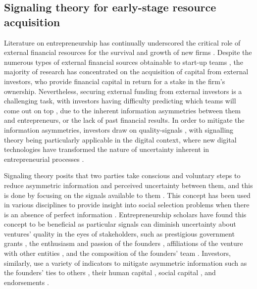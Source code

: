 \documentclass[12pt]{article}
\begin{document}
\subsection{Signaling theory for early-stage resource acquisition}

Literature on entrepreneurship has continually underscored the critical role of external financial resources for the survival and growth of new firms \citep{cooper1994initial}. Despite the numerous types of external financial sources obtainable to start-up teams \citep{drover2017review, klein2020start}, the majority of research has concentrated on the acquisition of capital from external investors, who provide financial capital in return for a stake in the firm's ownership. Nevertheless, securing external funding from external investors is a challenging task, with investors having difficulty predicting which teams will come out on top \citep{ghassemiautomated}, due to the inherent information asymmetries between them and entrepreneurs, or the lack of past financial results. In order to mitigate the information asymmetries, investors draw on quality-signals \citep{ko2018signaling, spence1978job, subramanian2022backing}, with signalling theory being particularly applicable in the digital context, where new digital technologies have transformed the nature of uncertainty inherent in entrepreneurial processes \citep{nambisan2017digital}.

Signaling theory posits that two parties take conscious and voluntary steps to reduce asymmetric information and perceived uncertainty between them, and this is done by focusing on the signals available to them \citep{spence1974market}. This concept has been used in various disciplines to provide insight into social selection problems when there is an absence of perfect information \citep{connelly2011signaling, colombo2021use}. Entrepreneurship scholars have found this concept to be beneficial as particular signals can diminish uncertainty about ventures' quality in the eyes of stakeholders, such as prestigious government grants \citep{islam2018signaling}, the enthusiasm and passion of the founders \citep{chen2009entrepreneur}, affiliations of the venture with other entities \citep{plummer2016better}, and the composition of the founders' team \citep{ko2018signaling}. Investors, similarly, use a variety of indicators to mitigate asymmetric information such as the founders' ties to others \citep{shane2002network}, their human capital \citep{beckman2007early}, social capital \citep{shane2002organizational}, and endorsements \citep{courtney2017resolving, janney2006moderating, plummer2016better}.
\end{document}
